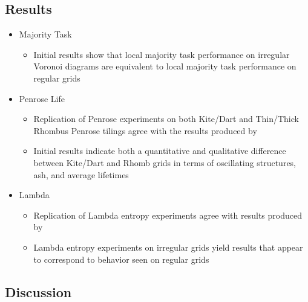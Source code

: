 \documentclass[a4paper, 11pt]{article}
\begin{document}
\subsection*{Results}

\begin{itemize}
\item Majority Task
\begin{itemize}
\item Initial results show that local majority task performance on irregular Voronoi diagrams are equivalent to local majority task performance on regular grids
\end{itemize}

\item Penrose Life
\begin{itemize}
\item Replication of Penrose experiments on both Kite/Dart and Thin/Thick Rhombus Penrose tilings agree with the results produced by \citeauthor{ow10}
\item Initial results indicate both a quantitative and qualitative difference between Kite/Dart and Rhomb grids in terms of oscillating structures, ash, and average lifetimes
\end{itemize}

\item Lambda

\begin{itemize}
\item Replication of Lambda entropy experiments agree with results produced by \citeauthor{wo90}

\item Lambda entropy experiments on irregular grids yield results that appear to correspond to behavior seen on regular grids
\end{itemize}

\end{itemize}

\subsection*{Discussion}
\end{document}
